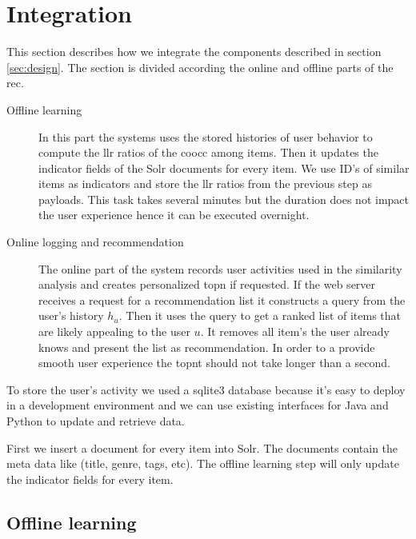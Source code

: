 \section{Integration}
\label{sec:integration}

This section describes how we integrate the components described in section \ref{sec:design}. The section is divided according the online and offline parts of the \gls{rec}.

\begin{description}
\item[Offline learning] In this part the systems uses the stored histories of user behavior to compute the \gls{llr} ratios of the \gls{coocc} am\-ong items. Then it updates the indicator fields of the Solr documents for every item. We use ID's of similar items as indicators and store the \gls{llr} ratios from the previous step as payloads. This task takes several minutes but the duration does not impact the user experience hence it can be executed overnight. 
\item[Online logging and recommendation] The online part of the system re\-cords user activities used in the similarity analysis and creates personalized \gls{topn} if requested. If the web server receives a request for a recommendation list it constructs a query from the user's history $h_u$. Then it uses the query to get a ranked list of items that are likely appealing to the user $u$. It removes all item's the user already knows and present the list as recommendation. In order to a  provide smooth user experience the \gls{topnt} should not take longer than a second.
\end{description}

To store the user's activity we used a sqlite3 database because it's easy to deploy in a development environment and we can use existing interfaces for Java and Python to update and retrieve data. 

First we insert a document for every item into Solr. The documents contain the meta data like (title, genre, tags, etc). The offline learning step will only update the indicator fields for every item.

\subsection{Offline learning}
\label{sec:offline}

